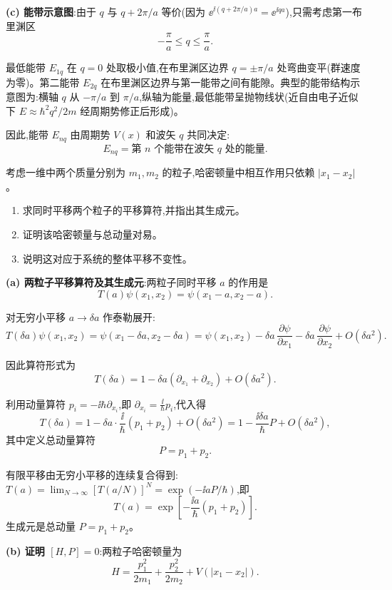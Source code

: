 \begin{question}
\begin{solution}
	\textbf{(c) 能带示意图}:由于 $q$ 与 $q+2\pi/a$ 等价(因为 $\ee^{\ii (q+2\pi/a)a}=\ee^{\ii qa}$),只需考虑第一布里渊区
	\[
	-\frac{\pi}{a}\le q\le\frac{\pi}{a}.
	\]

	最低能带 $E_{1q}$ 在 $q=0$ 处取极小值,在布里渊区边界 $q=\pm\pi/a$ 处弯曲变平(群速度为零)。第二能带 $E_{2q}$ 在布里渊区边界与第一能带之间有能隙。典型的能带结构示意图为:横轴 $q$ 从 $-\pi/a$ 到 $\pi/a$,纵轴为能量,最低能带呈抛物线状(近自由电子近似下 $E\approx\hbar^2q^2/2m$ 经周期势修正后形成)。

	因此,能带 $E_{nq}$ 由周期势 $V(x)$ 和波矢 $q$ 共同决定:
	\[
	\boxed{E_{nq}=\text{第 }n\text{ 个能带在波矢 }q\text{ 处的能量}}.
	\]
	\end{solution}
\end{question}

\begin{question}
考虑一维中两个质量分别为 $m_1,m_2$ 的粒子,哈密顿量中相互作用只依赖 $|x_1-x_2|$。
\begin{enumerate}
\item 求同时平移两个粒子的平移算符,并指出其生成元。
\item 证明该哈密顿量与总动量对易。
\item 说明这对应于系统的整体平移不变性。
\end{enumerate}
\begin{solution}
	\textbf{(a) 两粒子平移算符及其生成元}:两粒子同时平移 $a$ 的作用是
	\[
	T(a)\psi(x_1,x_2)=\psi(x_1-a,x_2-a).
	\]

	对无穷小平移 $a\to\delta a$ 作泰勒展开:
	\[
	T(\delta a)\psi(x_1,x_2)=\psi(x_1-\delta a,x_2-\delta a)
	=\psi(x_1,x_2)-\delta a\,\frac{\partial\psi}{\partial x_1}-\delta a\,\frac{\partial\psi}{\partial x_2}+O(\delta a^2).
	\]

	因此算符形式为
	\[
	T(\delta a)=1-\delta a(\partial_{x_1}+\partial_{x_2})+O(\delta a^2).
	\]

	利用动量算符 $p_i=-\ii\hbar\partial_{x_i}$,即 $\partial_{x_i}=\frac{\ii}{\hbar}p_i$,代入得
	\[
	T(\delta a)=1-\delta a\cdot\frac{\ii}{\hbar}(p_1+p_2)+O(\delta a^2)
	=1-\frac{\ii\delta a}{\hbar}P+O(\delta a^2),
	\]
	其中定义总动量算符
	\[
	P=p_1+p_2.
	\]

	有限平移由无穷小平移的连续复合得到:$T(a)=\lim_{N\to\infty}[T(a/N)]^N=\exp(-\ii a P/\hbar)$,即
	\[
	\boxed{T(a)=\exp\!\left[-\frac{\ii a}{\hbar}(p_1+p_2)\right]}.
	\]
	生成元是总动量 $P=p_1+p_2$。

	\textbf{(b) 证明 $[H,P]=0$}:两粒子哈密顿量为
	\[
	H=\frac{p_1^2}{2m_1}+\frac{p_2^2}{2m_2}+V(|x_1-x_2|).
	\]


\end{solution}
\end{question}
